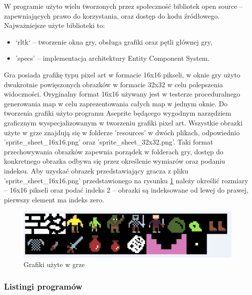 \documentclass[12pt,twoside]{article}
\begin{document}
W programie użyto wielu tworzonych przez społeczność bibliotek open source -- zapewniających prawo do korzystania, oraz dostęp do kodu źródłowego. Najważniejsze użyte biblioteki to:
\begin{itemize}
	\item `rltk` -- tworzenie okna gry, obsługa grafiki oraz pętli głównej gry,
	\item 'specs' -- implementacja architektury Entity Component System.
\end{itemize}

Gra posiada grafikę typu pixel art w formacie 16x16 pikseli, w oknie gry użyto dwukrotnie powięszonych obrazków w formacie 32x32 w celu polepszenia widoczności. Oryginalny format 16x16 używany jest w testerze proceduralnego generowania map w celu zaprezentowania całych map w jednym oknie. Do tworzenia grafiki użyto programu Aseprite \cite{aseprite} będącego wygodnym narzędziem graficznym wyspecjalizowanym w tworzeniu grafiki pixel art. Wszystkie obrazki użyte w grze znajdują się w folderze 'resources' w dwóch plikach, odpowiednio 'sprite\_sheet\_16x16.png' oraz 'sprite\_sheet\_32x32.png'. Taki format przechowywania obrazków zapewnia porządek w folderach gry, dostęp do konkretnego obrazka odbywa się przez określenie wymiarów oraz podaniu indeksu. Aby uzyskać obrazek przedstawiający gracza z pliku 'sprite\_sheet\_16x16.png' przedstawionego na rysunku \ref{mygame:spritesheet} należy określić rozmiary -- 16x16 pikseli oraz podać indeks 2 -- obrazki są indeksowane od lewej do prawej, pierwszy element ma indeks zero.

\FloatBarrier
\begin{figure}[h]
	\centering
	\includegraphics[width=12cm]{images/mygame/spritesheet.png}
	\caption{Grafiki użyte w grze}
	\label{mygame:spritesheet}
\end{figure}
\FloatBarrier















\iffalse


{\subsubsection{Listingi programów}}
\end{document}
